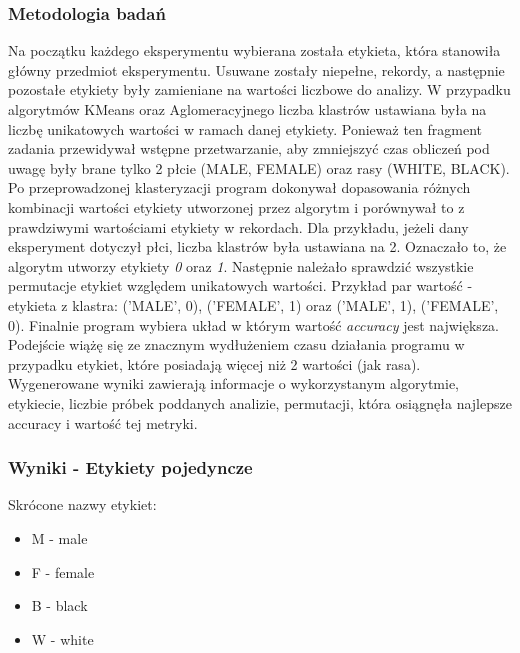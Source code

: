 \documentclass{classrep}
\begin{document}
{{            \subsubsection{Metodologia badań}
            Na początku każdego eksperymentu wybierana została etykieta, która stanowiła główny przedmiot eksperymentu. Usuwane zostały niepełne, rekordy, a następnie pozostałe etykiety były zamieniane na wartości liczbowe do analizy. W przypadku algorytmów KMeans oraz Aglomeracyjnego liczba klastrów ustawiana była na liczbę unikatowych wartości w ramach danej etykiety. Ponieważ ten fragment zadania przewidywał wstępne przetwarzanie, aby zmniejszyć czas obliczeń pod uwagę były brane tylko 2 płcie (MALE, FEMALE) oraz rasy (WHITE, BLACK). Po przeprowadzonej klasteryzacji program dokonywał dopasowania różnych kombinacji wartości etykiety utworzonej przez algorytm i porównywał to z prawdziwymi wartościami etykiety w rekordach. Dla przykładu, jeżeli dany eksperyment dotyczył płci, liczba klastrów była ustawiana na 2. Oznaczało to, że algorytm utworzy etykiety \textit{0} oraz \textit{1}. Następnie należało sprawdzić wszystkie permutacje etykiet względem unikatowych wartości.
            Przykład par wartość - etykieta z klastra:
            ('MALE', 0), ('FEMALE', 1) oraz
            ('MALE', 1), ('FEMALE', 0). Finalnie program wybiera układ w którym wartość \textit{accuracy} jest największa.
            Podejście wiążę się ze znacznym wydłużeniem czasu działania programu w przypadku etykiet, które posiadają więcej niż 2 wartości (jak rasa).
            Wygenerowane wyniki zawierają informacje o wykorzystanym algorytmie, etykiecie, liczbie próbek poddanych analizie, permutacji, która osiągnęła najlepsze accuracy i wartość tej metryki.
            
            \subsubsection{Wyniki - Etykiety pojedyncze}
            
            Skrócone nazwy etykiet:
            \begin{itemize}
                \item M - male
                \item F - female
                \item B - black
                \item W - white
            \end{itemize}
            
}}
\end{document}

